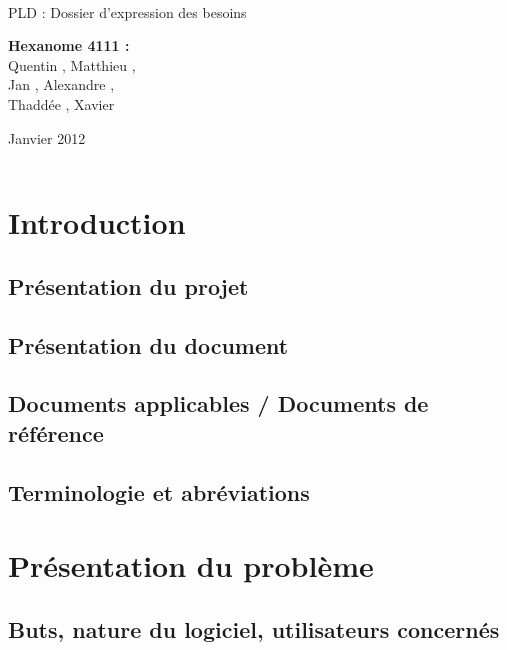 \documentclass[a4paper]{article}
\begin{document}
\begin{titlepage}
~ 
\vfill
	\begin{center}
		\begin{Huge}
		PLD : Dossier d'expression des besoins\\
		\end{Huge} 
\vfill
		\textbf{Hexanome 4111 :} 
		\\Quentin {}, Matthieu , 
		\\Jan {}, Alexandre , 
		\\Thaddée , Xavier \\
\vfill		
		\begin{Large}
		Janvier 2012
		\end{Large}
\vfill
	\begin{tabular}{|c|c|c|c|}
 	 \hline
	\end{tabular}
	\end{center}
\vfill
\end{titlepage}
\newpage
\tableofcontents
\newpage

\section{Introduction}
\subsection{Présentation du projet}
\subsection{Présentation du document}
\subsection{Documents applicables / Documents de référence}
\subsection{Terminologie et abréviations}

\section{Présentation du problème}
\subsection{Buts, nature du logiciel, utilisateurs concernés}
\end{document}
